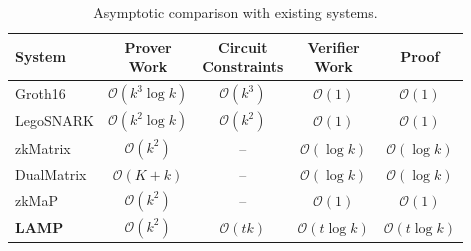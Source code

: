 \documentclass[conference,compsoc]{IEEEtran}
\newif\ifshowrevisions
\theoremstyle{plain}
\theoremstyle{definition}
\theoremstyle{remark}
\begin{document}
\begin{table}[t]
\centering
\footnotesize
  \ifshowrevisions
    \rowcolors{1}{yellow!20}{yellow!20}
  \fi
\setlength{\tabcolsep}{2pt}
\renewcommand{\arraystretch}{1.08}
\begin{tabular*}{\columnwidth}{@{\extracolsep{\fill}}lcccc@{}}
\toprule
\textbf{System} &
\shortstack{\textbf{Prover}\\\textbf{Work}} &
\shortstack{\textbf{Circuit}\\\textbf{Constraints}} &
\shortstack{\textbf{Verifier}\\\textbf{Work}} &
\textbf{Proof} \\
\midrule
Groth16
& $\mathcal{O}(k^3 \log k)$
& $\mathcal{O}(k^3)$
& $\mathcal{O}(1)$
& $\mathcal{O}(1)$ \\
    LegoSNARK
    & $\mathcal{O}(k^2 \log k)$
    & $\mathcal{O}(k^2)$
    & $\mathcal{O}(1)$
    & $\mathcal{O}(1)$ \\

    zkMatrix
    & $\mathcal{O}(k^2)$
    & -- 
    & $\mathcal{O}(\log k)$
    & $\mathcal{O}(\log k)$ \\

    DualMatrix
    & $\mathcal{O}(K+k)$
    & --
    & $\mathcal{O}(\log k)$
    & $\mathcal{O}(\log k)$ \\

    zkMaP
    & $\mathcal{O}(k^2)$
    & --
    & $\mathcal{O}(1)$
    & $\mathcal{O}(1)$ \\

    \textbf{LAMP}
    & $\mathcal{O}(k^2)$
    & $\mathcal{O}(tk)$
    & $\mathcal{O}(t\log k)$
    & $\mathcal{O}(t\log k)$ \\
    \bottomrule
\end{tabular*}
\vspace{4pt}
\caption{Asymptotic comparison with existing systems.}
\label{tab:asymptotic_comparison}
\end{table}


\end{document}
